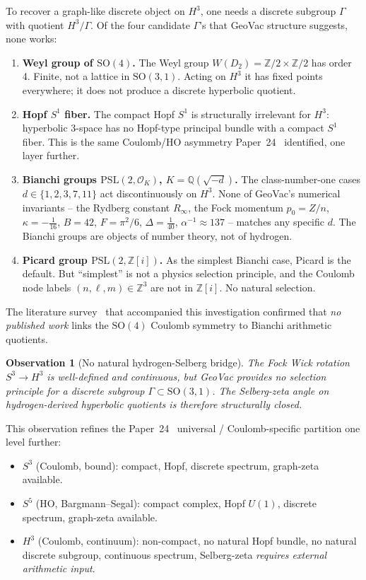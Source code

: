 \documentclass[11pt]{article}
\newtheorem{observation}{Observation}
\begin{document}
To recover a graph-like discrete object on $H^3$, one needs a
discrete subgroup $\Gamma$ with quotient $H^3/\Gamma$.  Of the four
candidate $\Gamma$'s that GeoVac structure suggests, none works:

\begin{enumerate}
\item \textbf{Weyl group of $\mathrm{SO}(4)$.}  The Weyl group
$W(D_2)=\mathbb{Z}/2\times\mathbb{Z}/2$ has order 4.  Finite, not a
lattice in $\mathrm{SO}(3,1)$.  Acting on $H^3$ it has fixed points
everywhere; it does not produce a discrete hyperbolic quotient.
\item \textbf{Hopf $S^1$ fiber.}  The compact Hopf $S^1$ is
structurally irrelevant for $H^3$: hyperbolic 3-space has no Hopf-type
principal bundle with a compact $S^1$ fiber.  This is the same
Coulomb/HO asymmetry Paper~24~\cite{paper24} identified, one layer
further.
\item \textbf{Bianchi groups $\mathrm{PSL}(2,\mathcal{O}_K)$,
$K=\mathbb{Q}(\sqrt{-d})$.}  The class-number-one cases
$d\in\{1,2,3,7,11\}$ act discontinuously on $H^3$.  None of GeoVac's
numerical invariants -- the Rydberg constant $R_\infty$, the Fock
momentum $p_0=Z/n$, $\kappa=-\tfrac{1}{16}$, $B=42$, $F=\pi^2/6$,
$\Delta=\tfrac{1}{40}$, $\alpha^{-1}\approx 137$ -- matches any
specific $d$.  The Bianchi groups are objects of number theory, not
of hydrogen.
\item \textbf{Picard group $\mathrm{PSL}(2,\mathbb{Z}[i])$.}  As the
simplest Bianchi case, Picard is the default.  But ``simplest'' is
not a physics selection principle, and the Coulomb node labels
$(n,\ell,m)\in\mathbb{Z}^3$ are not in $\mathbb{Z}[i]$.  No natural
selection.
\end{enumerate}

The literature survey~\cite{rh_survey} that accompanied this
investigation confirmed that \emph{no published work} links the
$\mathrm{SO}(4)$ Coulomb symmetry to Bianchi arithmetic quotients.

\begin{observation}[No natural hydrogen-Selberg bridge]
\label{obs:no_selberg}
The Fock Wick rotation $S^3\to H^3$ is well-defined and continuous,
but GeoVac provides no selection principle for a discrete subgroup
$\Gamma\subset\mathrm{SO}(3,1)$.  The Selberg-zeta angle on
hydrogen-derived hyperbolic quotients is therefore structurally
closed.
\end{observation}

This observation refines the Paper~24~\cite{paper24} universal /
Coulomb-specific partition one level further:
\begin{itemize}
\item $S^3$ (Coulomb, bound): compact, Hopf, discrete
spectrum, graph-zeta available.
\item $S^5$ (HO, Bargmann--Segal): compact complex, Hopf $U(1)$,
discrete spectrum, graph-zeta available.
\item $H^3$ (Coulomb, continuum): non-compact, no natural Hopf
bundle, no natural discrete subgroup, continuous spectrum,
Selberg-zeta \emph{requires external arithmetic input}.
\end{itemize}
\end{document}
